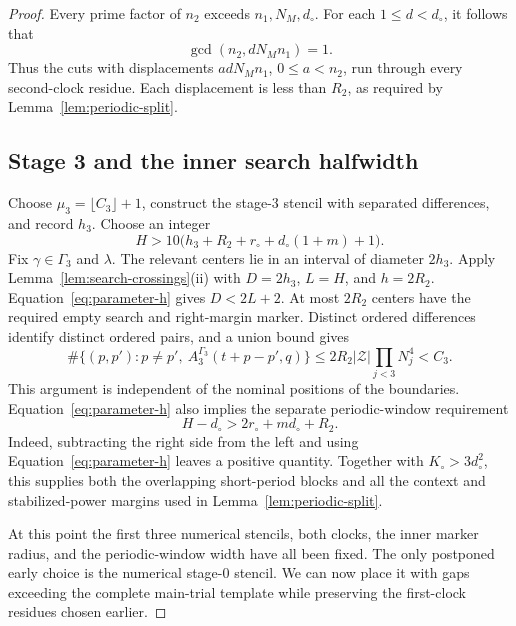 \begin{proof}
Every prime factor of \(n_2\) exceeds \(n_1,N_M,d_\circ\).
For each \(1\le d<d_\circ\), it follows that
\[
 \gcd(n_2,dN_Mn_1)=1.
\]
Thus the cuts with displacements
\(a dN_Mn_1\), \(0\le a<n_2\), run through every second-clock
residue.  Each displacement is less than \(R_2\), as required by
Lemma~\ref{lem:periodic-split}.

\subsection*{Stage 3 and the inner search halfwidth}
Choose \(\mu_3=\lfloor C_3\rfloor+1\), construct the stage-3 stencil
with separated differences, and record \(h_3\).  Choose an integer
\begin{equation}\label{eq:parameter-h}
 H>10\bigl(h_3+R_2+r_\circ+d_\circ(1+m)+1\bigr).
\end{equation}
Fix \(\gamma\in\Gamma_3\) and \(\lambda\). The relevant centers lie in an
interval of diameter \(2h_3\). Apply Lemma~\ref{lem:search-crossings}(ii)
with \(D=2h_3\), \(L=H\), and \(h=2R_2\).
Equation~\eqref{eq:parameter-h} gives \(D<2L+2\).
At most \(2R_2\) centers have the required empty search and right-margin
marker. Distinct ordered differences identify distinct ordered pairs,
and a union bound gives
\[
 \#\{(p,p'):p\ne p',\ A_3^{\Gamma_3}(t+p-p',q)\}
 \le2R_2|\mathcal Z|\prod_{j<3}N_j^4<C_3.
\]
This argument is independent of the nominal positions of the
boundaries.  Equation~\eqref{eq:parameter-h} also implies the separate
periodic-window requirement
\begin{equation}\label{eq:parameter-periodic-margin}
 H-d_\circ>2r_\circ+m d_\circ+R_2.
\end{equation}
Indeed, subtracting the right side from the left and using
Equation~\eqref{eq:parameter-h} leaves a positive quantity.  Together
with \(K_\circ>3d_\circ^2\), this supplies both the overlapping
short-period blocks and all the context and stabilized-power
margins used in Lemma~\ref{lem:periodic-split}.

At this point the first three numerical stencils, both clocks, the inner
marker radius, and the periodic-window width have all been fixed. The
only postponed early choice is the numerical stage-0 stencil. We can
now place it with gaps exceeding the complete main-trial template while
preserving the first-clock residues chosen earlier.


\end{proof}
